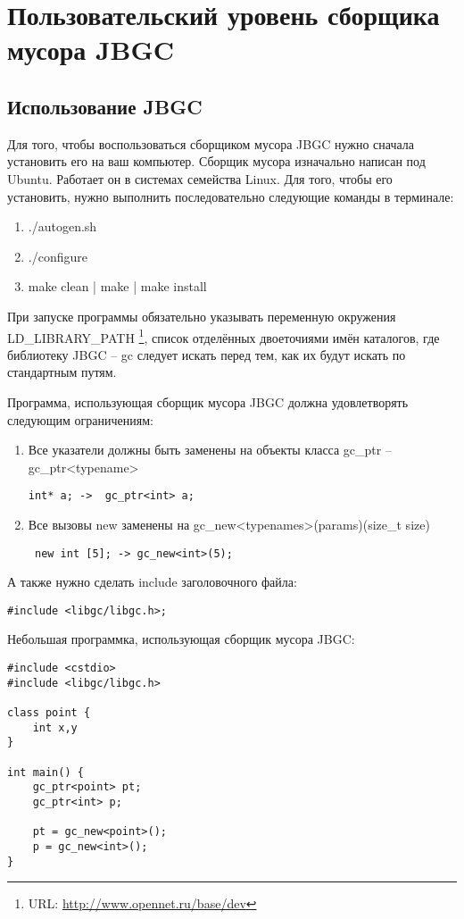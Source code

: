 \section {Пользовательский уровень сборщика мусора JBGC}

\subsection {Использование JBGC}
Для того, чтобы воспользоваться сборщиком мусора JBGC нужно сначала установить его на ваш компьютер. Сборщик мусора изначально написан под Ubuntu. Работает он в системах семейства Linux. Для того, чтобы его установить, нужно выполнить последовательно следующие команды в терминале:
\begin{enumerate}
\item ./autogen.sh
\item ./configure
\item make clean | make | make install
\end {enumerate}

При запуске программы обязательно указывать переменную окружения LD\_LIBRARY\_PATH \footnote{URL: \url{http://www.opennet.ru/base/dev}}, список отделённых  двоеточиями  имён каталогов, где библиотеку JBGC -- gc следует искать перед  тем,  как  их  будут  искать  по стандартным путям.

Программа, использующая сборщик мусора JBGC должна удовлетворять следующим ограничениям:
\begin{enumerate}
\item Все указатели  должны быть заменены на  объекты класса gc\_ptr -- gc\_ptr<typename> \begin{lstlisting}int* a; ->  gc_ptr<int> a;
\end{lstlisting}
\item Все вызовы new заменены на gc\_new<typenames>(params)(size\_t size) \begin{lstlisting} new int [5]; -> gc_new<int>(5);
\end{lstlisting}
\end {enumerate}
А также нужно сделать include заголовочного файла:\begin{lstlisting}
#include <libgc/libgc.h>;
\end{lstlisting}

Небольшая программка, использующая сборщик мусора JBGC:
\begin{lstlisting}
#include <cstdio>
#include <libgc/libgc.h>

class point {
	int x,y
}

int main() {
	gc_ptr<point> pt;
	gc_ptr<int> p;

	pt = gc_new<point>();
	p = gc_new<int>();
}

\end{lstlisting}
